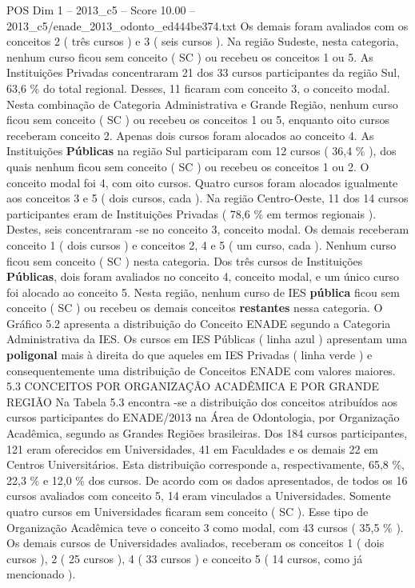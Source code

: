 \begin{textsample}{POS Dim 1 – 2013\_c5 – Score 10.00 – 2013\_c5/enade\_2013\_odonto\_ed444be374.txt}
Os demais foram avaliados com os conceitos 2 ( três cursos ) e 3 ( seis cursos ).
Na região Sudeste, nesta categoria, nenhum curso ficou sem conceito ( SC ) ou recebeu os conceitos 1 ou 5.
As Instituições Privadas concentraram 21 dos 33 cursos participantes da região Sul, 63,6 \% do total regional.
Desses, 11 ficaram com conceito 3, o conceito modal.
Nesta combinação de Categoria Administrativa e Grande Região, nenhum curso ficou sem conceito ( SC ) ou recebeu os conceitos 1 ou 5, enquanto oito cursos receberam conceito 2.
Apenas dois cursos foram alocados ao conceito 4.
As Instituições \textbf{Públicas} na região Sul participaram com 12 cursos ( 36,4 \% ), dos quais nenhum ficou sem conceito ( SC ) ou recebeu os conceitos 1 ou 2.
O conceito modal foi 4, com oito cursos.
Quatro cursos foram alocados igualmente aos conceitos 3 e 5 ( dois cursos, cada ).
Na região Centro-Oeste, 11 dos 14 cursos participantes eram de Instituições Privadas ( 78,6 \% em termos regionais ).
Destes, seis concentraram -se no conceito 3, conceito modal.
Os demais receberam conceito 1 ( dois cursos ) e conceitos 2, 4 e 5 ( um curso, cada ).
Nenhum curso ficou sem conceito ( SC ) nesta categoria.
Dos três cursos de Instituições \textbf{Públicas}, dois foram avaliados no conceito 4, conceito modal, e um único curso foi alocado ao conceito 5.
Nesta região, nenhum curso de IES \textbf{pública} ficou sem conceito ( SC ) ou recebeu os demais conceitos \textbf{restantes} nessa categoria.
O Gráfico 5.2 apresenta a distribuição do Conceito ENADE segundo a Categoria Administrativa da IES.
Os cursos em IES Públicas ( linha azul ) apresentam uma \textbf{poligonal} mais à direita do que aqueles em IES Privadas ( linha verde ) e consequentemente uma distribuição de Conceitos ENADE com valores maiores. 5.3 CONCEITOS POR ORGANIZAÇÃO ACADÊMICA E POR GRANDE REGIÃO Na Tabela 5.3 encontra -se a distribuição dos conceitos atribuídos aos cursos participantes do ENADE/2013 na Área de Odontologia, por Organização Acadêmica, segundo as Grandes Regiões brasileiras.
Dos 184 cursos participantes, 121 eram oferecidos em Universidades, 41 em Faculdades e os demais 22 em Centros Universitários.
Esta distribuição corresponde a, respectivamente, 65,8 \%, 22,3 \% e 12,0 \% dos cursos.
De acordo com os dados apresentados, de todos os 16 cursos avaliados com conceito 5, 14 eram vinculados a Universidades.
Somente quatro cursos em Universidades ficaram sem conceito ( SC ).
Esse tipo de Organização Acadêmica teve o conceito 3 como modal, com 43 cursos ( 35,5 \% ).
Os demais cursos de Universidades avaliados, receberam os conceitos 1 ( dois cursos ), 2 ( 25 cursos ), 4 ( 33 cursos ) e conceito 5 ( 14 cursos, como já mencionado ).

\end{textsample}
